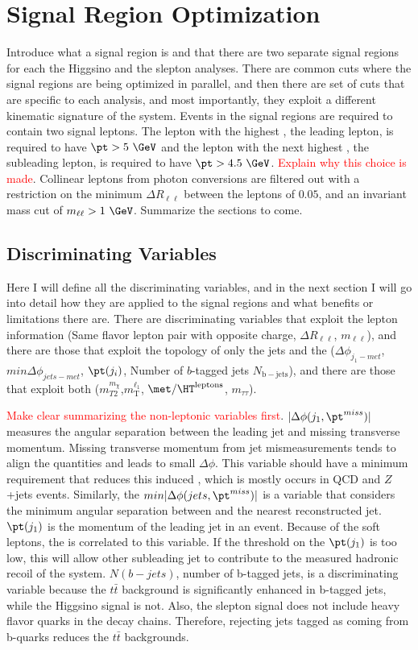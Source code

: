 \chapter{Signal Region Optimization}
 \label{sec:sr}
Introduce what a signal region is and that there are two separate signal regions for each the Higgsino and the slepton analyses.  There are common cuts where the signal regions are being optimized in parallel, and then there are set of cuts that are specific to each analysis, and most importantly, they exploit a different kinematic signature of the system.  Events in the signal regions are required to contain two signal leptons.  The lepton with the highest \pt, the leading lepton, is required to have $\pt > 5~\GeV$ and the lepton with the next highest \pt, the subleading lepton, is required to have $\pt > 4.5~\GeV$.  \textcolor{red}{Explain why this choice is made}.  Collinear leptons from photon conversions are filtered out with a restriction on the minimum $\Delta R_{\ell\ell}$ between the leptons of $0.05$, and an invariant mass cut of $m_{\ell\ell} > 1 ~\GeV$.
Summarize the sections to come.
\section{Discriminating Variables}
\label{sec:discvar}
Here I will define all the discriminating variables, and in the next section I will go into detail how they are applied to the signal regions and what benefits or limitations there are.  There are discriminating variables that exploit the lepton information (Same flavor lepton pair with opposite charge, $\Delta R_{\ell\ell}$, $m_{\ell\ell}$), and there are those that exploit the topology of only the jets and the \met{} ($\Delta\phi_{ j_1-met}$, $min \Delta\phi_{jets-met}$, $\pt(j_i)$, Number of $b$-tagged jets $N_\mathrm{b-jets}$), and there are those that exploit both ($m_{T2}^{m_{\chi}}$,$m_\text{T}^{\ell_1}$, $\met/\HT^\text{leptons}$, $m_{\tau\tau}$).  

\textcolor{red}{Make clear summarizing the non-leptonic variables first}. $|\Delta\phi(j_1, \pt^{miss})|$ measures the angular separation between the leading jet and missing transverse momentum.  Missing transverse momentum from jet mismeasurements tends to align the quantities and leads to small $\Delta\phi$.  This variable should have a minimum requirement that reduces this induced \met{}, which is mostly occurs in QCD and $Z$+jets events.  Similarly, the $min|\Delta\phi(jets, \pt^{miss})|$ is a variable that considers the minimum angular separation between \met{} and the nearest reconstructed jet.  $\pt(j_1)$ is the momentum of the leading jet in an event.  Because of the soft leptons, the \met{} is correlated to this variable.  If the threshold on the $\pt(j_1)$ is too low, this will allow other subleading jet to contribute to the measured hadronic recoil of the system.  $N(b-jets)$, number of b-tagged jets, is a discriminating variable because the $t\bar{t}$ background is significantly enhanced in b-tagged jets, while the Higgsino signal is not.   Also, the slepton signal does not include heavy flavor quarks in the decay chains.  Therefore, rejecting jets tagged as coming from b-quarks reduces the $t\bar{t}$ backgrounds.

